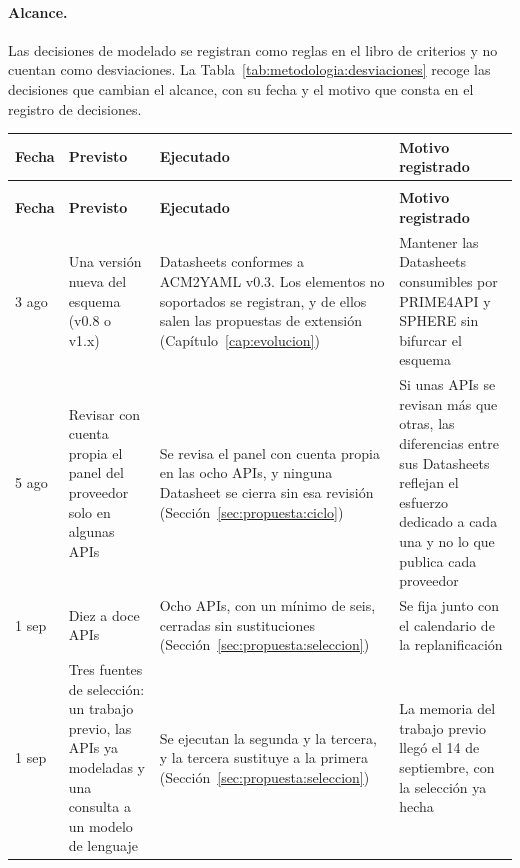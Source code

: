 \paragraph{Alcance.} Las decisiones de modelado se registran como
reglas en el libro de criterios y no cuentan como desviaciones. La
Tabla~\ref{tab:metodologia:desviaciones} recoge las decisiones que
cambian el alcance, con su fecha y el motivo que consta en el registro
de decisiones.

\begingroup
\setlength{\tabcolsep}{3pt}
\setlength{\LTcapwidth}{\textwidth}
\begin{longtable}{|>{\footnotesize}p{}|>{\footnotesize}p{}|>{\footnotesize}p{}|>{\footnotesize}p{}|}
\hline
\raggedright \textbf{Fecha} & \raggedright \textbf{Previsto} & \raggedright \textbf{Ejecutado} & \raggedright \textbf{Motivo registrado} \tabularnewline
\hline
\endfirsthead
\multicolumn{4}{l}{\footnotesize\textit{(continuación)}} \tabularnewline
\hline
\raggedright \textbf{Fecha} & \raggedright \textbf{Previsto} & \raggedright \textbf{Ejecutado} & \raggedright \textbf{Motivo registrado} \tabularnewline
\hline
\endhead
\raggedright 3 ago & \raggedright Una versión nueva del esquema (v0.8 o v1.x) & \raggedright Datasheets conformes a ACM2YAML v0.3. Los elementos no soportados se registran, y de ellos salen las propuestas de extensión (Capítulo~\ref{cap:evolucion}) & \raggedright Mantener las Datasheets consumibles por PRIME4API y SPHERE sin bifurcar el esquema \tabularnewline
\hline
\raggedright 5 ago & \raggedright Revisar con cuenta propia el panel del proveedor solo en algunas APIs & \raggedright Se revisa el panel con cuenta propia en las ocho APIs, y ninguna Datasheet se cierra sin esa revisión (Sección~\ref{sec:propuesta:ciclo}) & \raggedright Si unas APIs se revisan más que otras, las diferencias entre sus Datasheets reflejan el esfuerzo dedicado a cada una y no lo que publica cada proveedor \tabularnewline
\hline
\raggedright 1 sep & \raggedright Diez a doce APIs & \raggedright Ocho APIs, con un mínimo de seis, cerradas sin sustituciones (Sección~\ref{sec:propuesta:seleccion}) & \raggedright Se fija junto con el calendario de la replanificación \tabularnewline
\hline
\raggedright 1 sep & \raggedright Tres fuentes de selección: un trabajo previo, las APIs ya modeladas y una consulta a un modelo de lenguaje & \raggedright Se ejecutan la segunda y la tercera, y la tercera sustituye a la primera (Sección~\ref{sec:propuesta:seleccion}) & \raggedright La memoria del trabajo previo llegó el 14 de septiembre, con la selección ya hecha \tabularnewline

\end{longtable}

